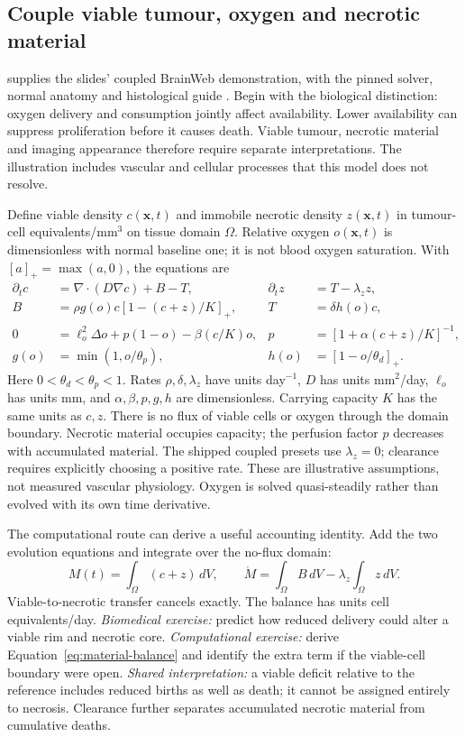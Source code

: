 \documentclass[11pt,a4paper]{article}
\begin{document}
\subsection{Couple viable tumour, oxygen and necrotic material}\label{sec:coupled}
 supplies the slides' coupled BrainWeb demonstration, with the pinned solver, normal anatomy and histological guide \citep{comba2021heterogeneity}. Begin with the biological distinction: oxygen delivery and consumption jointly affect availability. Lower availability can suppress proliferation before it causes death. Viable tumour, necrotic material and imaging appearance therefore require separate interpretations. The illustration includes vascular and cellular processes that this model does not resolve.

Define viable density $c(\mathbf x,t)$ and immobile necrotic density $z(\mathbf x,t)$ in tumour-cell equivalents/mm$^3$ on tissue domain $\Omega$. Relative oxygen $o(\mathbf x,t)$ is dimensionless with normal baseline one; it is not blood oxygen saturation. With $[a]_+=\max(a,0)$, the equations are
\begin{align}
\partial_t c&=\nabla\!\cdot(D\nabla c)+B-T, &
\partial_t z&=T-\lambda_z z,\\
B&=\rho g(o)c[1-(c+z)/K]_+, & T&=\delta h(o)c,\\
0&=\ell_o^2\Delta o+p(1-o)-\beta(c/K)o, &
p&=[1+\alpha(c+z)/K]^{-1},\\
g(o)&=\min(1,o/\theta_p), &h(o)&=[1-o/\theta_d]_+.
\end{align}
Here $0<\theta_d<\theta_p<1$. Rates $\rho,\delta,\lambda_z$ have units day$^{-1}$, $D$ has units mm$^2$/day, $\ell_o$ has units mm, and $\alpha,\beta,p,g,h$ are dimensionless. Carrying capacity $K$ has the same units as $c,z$. There is no flux of viable cells or oxygen through the domain boundary. Necrotic material occupies capacity; the perfusion factor $p$ decreases with accumulated material. The shipped coupled presets use $\lambda_z=0$; clearance requires explicitly choosing a positive rate. These are illustrative assumptions, not measured vascular physiology. Oxygen is solved quasi-steadily rather than evolved with its own time derivative.

The computational route can derive a useful accounting identity. Add the two evolution equations and integrate over the no-flux domain:
\begin{equation}\label{eq:material-balance}
M(t)=\int_\Omega(c+z)\,dV,\qquad
\dot M=\int_\Omega B\,dV-\lambda_z\int_\Omega z\,dV.
\end{equation}
Viable-to-necrotic transfer cancels exactly. The balance has units cell equivalents/day. \emph{Biomedical exercise:} predict how reduced delivery could alter a viable rim and necrotic core. \emph{Computational exercise:} derive Equation~\ref{eq:material-balance} and identify the extra term if the viable-cell boundary were open. \emph{Shared interpretation:} a viable deficit relative to the reference includes reduced births as well as death; it cannot be assigned entirely to necrosis. Clearance further separates accumulated necrotic material from cumulative deaths.
\end{document}
